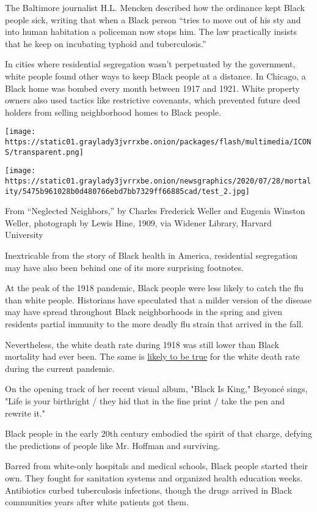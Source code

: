 The Baltimore journalist H.L. Mencken described how the ordinance kept
Black people sick, writing that when a Black person ``tries to move out
of his sty and into human habitation a policeman now stops him. The law
practically insists that he keep on incubating typhoid and
tuberculosis.''

In cities where residential segregation wasn't perpetuated by the
government, white people found other ways to keep Black people at a
distance. In Chicago, a Black home was bombed every month between 1917
and 1921. White property owners also used tactics like restrictive
covenants, which prevented future deed holders from selling neighborhood
homes to Black people.

\texttt{[image: https://static01.graylady3jvrrxbe.onion/packages/flash/multimedia/ICONS/transparent.png]}

\texttt{[image: https://static01.graylady3jvrrxbe.onion/newsgraphics/2020/07/28/mortality/5475b961028b0d480766ebd7bb7329ff66885cad/test\_2.jpg]}

From ``Neglected Neighbors,'' by Charles Frederick Weller and Eugenia
Winston Weller, photograph by Lewis Hine, 1909, via Widener Library,
Harvard University

Inextricable from the story of Black health in America, residential
segregation may have also been behind one of its more surprising
footnotes.

At the peak of the 1918 pandemic, Black people were less likely to catch
the flu than white people. Historians have speculated that a milder
version of the disease may have spread throughout Black neighborhoods in
the spring and given residents partial immunity to the more deadly flu
strain that arrived in the fall.

Nevertheless, the white death rate during 1918 was still lower than
Black mortality had ever been. The same is
\href{https://osf.io/9csa6/}{likely to be true} for the white death rate
during the current pandemic.

On the opening track of her recent visual album, "Black Is King,"
Beyoncé sings, "Life is your birthright / they hid that in the fine
print / take the pen and rewrite it."

Black people in the early 20th century embodied the spirit of that
charge, defying the predictions of people like Mr. Hoffman and
surviving.

Barred from white-only hospitals and medical schools, Black people
started their own. They fought for sanitation systems and organized
health education weeks. Antibiotics curbed tuberculosis infections,
though the drugs arrived in Black communities years after white patients
got them.

